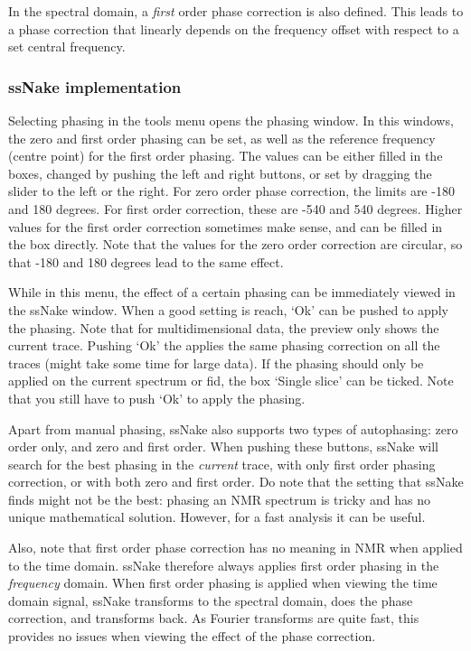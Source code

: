 \documentclass[11pt,a4paper]{article}
\begin{document}
In the spectral domain, a \textit{first} order phase correction is also defined. This leads to a phase correction that linearly depends on the frequency offset with respect to a set central frequency. 


\subsubsection*{ssNake implementation}
Selecting phasing in the tools menu opens the phasing window. In this windows, the zero and first order phasing can be set, as well as the reference frequency (centre point) for the first order phasing. The values can be either filled in the boxes,  changed by pushing the left and right buttons, or set by dragging the slider to the left or the right. For zero order phase correction, the limits are -180 and 180 degrees. For first order correction, these are -540 and 540 degrees. Higher values for the first order correction sometimes make sense, and can be filled in the box directly. Note that the values for the zero order correction are circular, so that -180 and 180 degrees lead to the same effect.

While in this menu, the effect of a certain phasing can be immediately viewed in the ssNake window. When a good setting is reach, `Ok' can be pushed to apply the phasing. Note that for multidimensional data, the preview only shows the current trace. Pushing `Ok' the applies the same phasing correction on all the traces (might take some time for large data). If the phasing should only be applied on the current spectrum or fid, the box `Single slice' can be ticked. Note that you still have to push `Ok' to apply the phasing.

Apart from manual phasing, ssNake also supports two types of autophasing: zero order only, and zero and first order. When pushing these buttons, ssNake will search for the best phasing in the \textit{current} trace, with only first order phasing correction, or with both zero and first order. Do note that the setting that ssNake finds might not be the best: phasing an NMR spectrum is tricky and has no unique mathematical solution. However, for a fast analysis it can be useful.

Also, note that first order phase correction has no meaning in NMR when applied to the time domain. ssNake therefore always applies first order phasing in the \textit{frequency} domain. When first order phasing is applied when viewing the time domain signal, ssNake transforms to the spectral domain, does the phase correction, and transforms back. As Fourier transforms are quite fast, this provides no issues when viewing the effect of the phase correction.
\end{document}
